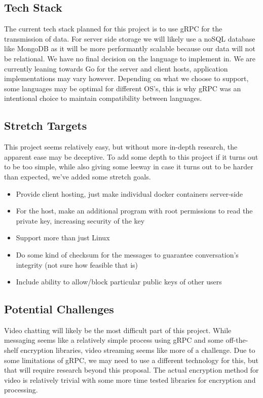 \documentclass[titlepage]{article}
\begin{document}
    \subsection{Tech Stack}

      The current tech stack planned for this project is to use gRPC for the transmission of data.
      For server side storage we will likely use a noSQL database like MongoDB as it will be more performantly scalable because our data will not be relational.
      We have no final decision on the language to implement in.
      We are currently leaning towards Go for the server and client hosts, application implementations may vary however.
      Depending on what we choose to support, some languages may be optimal for different OS's, this is why gRPC was an intentional choice to maintain compatibility between languages.

      \subsection{Stretch Targets}

      This project seems relatively easy, but without more in-depth research, the apparent ease may be deceptive.
      To add some depth to this project if it turns out to be too simple, while also giving some leeway in case it turns out to be harder than expected, we've added some stretch goals.
      \begin{itemize}
          \item Provide client hosting, just make individual docker containers server-side
          \item For the host, make an additional program with root permissions to read the private key, increasing security of the key
          \item Support more than just Linux
          \item Do some kind of checksum for the messages to guarantee conversation's integrity (not sure how feasible that is)
          \item Include ability to allow/block particular public keys of other users
      \end{itemize}

      \subsection{Potential Challenges}

      Video chatting will likely be the most difficult part of this project.
      While messaging seems like a relatively simple process using gRPC and some off-the-shelf encryption libraries, video streaming seems like more of a challenge.
      Due to some limitations of gRPC, we may need to use a different technology for this, but that will require research beyond this proposal.
      The actual encryption method for video is relatively trivial with some more time tested libraries for encryption and processing.
\end{document}
